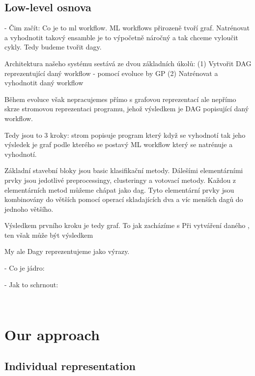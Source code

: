 \documentclass[a4paper,oneside]{memoir}
\begin{document}
\subsection{Low-level osnova}

- Čim začít: 
Co je to ml workflow. 
ML workflows přirozeně tvoří graf. 
Natrénovat a vyhodnotit takový ensamble je to výpočetně náročný a tak chceme vyloučit cykly. 
Tedy budeme tvořit dagy. 

Architektura našeho systému sestává ze dvou základních úkolů:
(1) Vytvořit DAG reprezentující daný workflow - pomocí evoluce by GP
(2) Natrénovat a vyhodnotit daný workflow

Během evoluce však nepracujemes přímo s grafovou reprezentací ale nepřímo skrze stromovou reprezentaci programu, jehož výsledkem je DAG popisující daný workflow.

Tedy jsou to 3 kroky: strom popisuje program který když se vyhodnotí tak jeho výsledek je graf podle kterého se postavý ML workflow který se natrénuje a vyhodnotí.


Základní stavební bloky jsou basic klasifikační metody.
Dálešími elementárními prvky jsou jedotlivé preprocessingy, clusteringy a votovací metody. 
Každou z elementárních metod můžeme chápat jako dag.
Tyto elementární prvky jsou kombinovány do větších pomocí operací skladajících dva a víc menších dagů do jednoho většího.

 


Výsledkem prvního kroku je tedy graf. 
To jak zacházíme s Při vytváření daného , ten však může být výsledkem  

My ale
Dagy reprezentujeme jako výrazy.

- Co je jádro:

- Jak to schrnout:

~\\


\section{Our approach}


\subsection{Individual representation}
\end{document}
